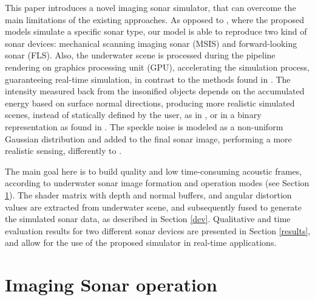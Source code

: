 \documentclass[final,5p,times]{elsarticle}
\begin{document}
This paper introduces a novel imaging sonar simulator, that can overcome
the main limitations of the existing approaches. As opposed to \cite{bell1997,coiras2009,gueriot2010,sac2015,demarco2015,gu2013,kwak2015}, where
the proposed models simulate a specific sonar type, our model is able to
reproduce two kind of sonar devices: mechanical scanning imaging sonar (MSIS) and forward-looking sonar (FLS). Also, the underwater scene is processed during the pipeline rendering on graphics processing unit (GPU), accelerating the simulation process, guaranteeing real-time simulation, in contrast to the methods found in \cite{bell1997,coiras2009,sac2015,demarco2015}. The intensity measured back from the insonified objects depends on the accumulated energy based on surface normal directions, producing more realistic simulated scenes, instead of statically defined by the user, as in \cite{demarco2015}, or in a binary representation as found in \cite{gu2013, kwak2015}. The speckle noise is modeled as a non-uniform Gaussian distribution and added to the final sonar image, performing a more realistic sensing, differently to \cite{gueriot2010,sac2015,gu2013,kwak2015}.

The main goal here is to build quality and low time\hyp{}consuming acoustic frames, according to underwater sonar image formation and operation modes (see Section \ref{sonar:operation}). The shader matrix with depth and normal buffers, and angular distortion values are extracted from underwater scene, and subsequently fused to generate the simulated sonar data, as described in Section \ref{dev}. Qualitative and time evaluation results for two different sonar devices are presented in Section \ref{results}, and allow for the use of the proposed simulator in real-time applications.


\section{Imaging Sonar operation}
\label{sonar:operation}

\end{document}
